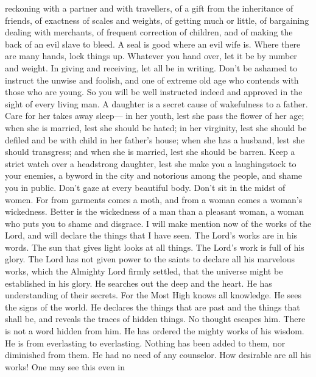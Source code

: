 reckoning with a partner and with travellers, of a gift from the
inheritance of friends,  of exactness of scales and weights,
of getting much or little,  of bargaining dealing with
merchants, of frequent correction of children, and of making the back of
an evil slave to bleed.  A seal is good where an evil wife
is. Where there are many hands, lock things up.  Whatever
you hand over, let it be by number and weight. In giving and receiving,
let all be in writing.  Don't be ashamed to instruct the
unwise and foolish, and one of extreme old age who contends with those
who are young. So you will be well instructed indeed and approved in the
sight of every living man.  A daughter is a secret cause of
wakefulness to a father. Care for her takes away sleep--- in her youth,
lest she pass the flower of her age; when she is married, lest she
should be hated;  in her virginity, lest she should be
defiled and be with child in her father's house; when she has a husband,
lest she should transgress; and when she is married, lest she should be
barren.  Keep a strict watch over a headstrong daughter,
lest she make you a laughingstock to your enemies, a byword in the city
and notorious among the people, and shame you in public. 
Don't gaze at every beautiful body. Don't sit in the midst of women.
 For from garments comes a moth, and from a woman comes a
woman's wickedness.  Better is the wickedness of a man than
a pleasant woman, a woman who puts you to shame and disgrace.
 I will make mention now of the works of the Lord, and will
declare the things that I have seen. The Lord's works are in his words.
 The sun that gives light looks at all things. The Lord's
work is full of his glory.  The Lord has not given power to
the saints to declare all his marvelous works, which the Almighty Lord
firmly settled, that the universe might be established in his glory.
 He searches out the deep and the heart. He has
understanding of their secrets. For the Most High knows all knowledge.
He sees the signs of the world.  He declares the things
that are past and the things that shall be, and reveals the traces of
hidden things.  No thought escapes him. There is not a word
hidden from him.  He has ordered the mighty works of his
wisdom. He is from everlasting to everlasting. Nothing has been added to
them, nor diminished from them. He had no need of any counselor.
 How desirable are all his works! One may see this even in
